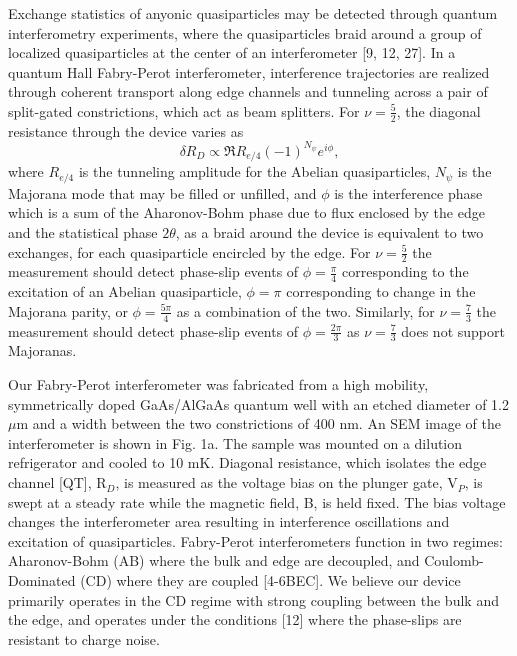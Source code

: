 \documentclass[]{article}
\begin{document}
	Exchange statistics of anyonic quasiparticles may be detected through quantum interferometry experiments, where the quasiparticles braid around a group of localized quasiparticles at the center of an interferometer [9, 12, 27]. In a quantum Hall Fabry-Perot interferometer, interference trajectories are realized through coherent transport along edge channels and tunneling across a pair of split-gated constrictions, which act as beam splitters. For $\nu = \frac{5}{2}$, the diagonal resistance through the device varies as 
	\begin{equation}
	\delta R_D \propto \Re{R_{e/4}(-1)^{N_\psi}e^{i\phi}},
	\end{equation}
	where $R_{e/4}$ is the tunneling amplitude for the Abelian quasiparticles, $N_\psi$ is the Majorana mode that may be filled or unfilled, and $\phi$ is the interference phase which is a sum of the Aharonov-Bohm phase due to flux enclosed by the edge and the statistical phase $2\theta$, as a braid around the device is equivalent to two exchanges, for each quasiparticle encircled by the edge. For $\nu=\frac{5}{2}$ the measurement should detect phase-slip events of $\phi = \frac{\pi}{4}$ corresponding to the excitation of an Abelian quasiparticle, $\phi = \pi$ corresponding to change in the Majorana parity, or $\phi = \frac{5\pi}{4}$ as a combination of the two. Similarly, for $\nu = \frac{7}{3}$ the measurement should detect phase-slip events of $\phi = \frac{2\pi}{3}$ as $\nu = \frac{7}{3}$ does not support Majoranas.
	
Our Fabry-Perot interferometer was fabricated from a high mobility, symmetrically doped GaAs/AlGaAs quantum well with an etched diameter of 1.2 $\mu$m and a width between the two constrictions of 400 nm. An SEM image of the interferometer is shown in Fig. 1a. The sample was mounted on a dilution refrigerator and cooled to 10 mK. Diagonal resistance, which isolates the edge channel [QT],   R$_D$, is measured as the voltage bias on the plunger gate, V$_P$, is swept at a steady rate while the magnetic field, B, is held fixed. The bias voltage changes the interferometer area resulting in interference oscillations and excitation of quasiparticles. Fabry-Perot interferometers function in two regimes: Aharonov-Bohm (AB) where the bulk and edge are decoupled, and Coulomb-Dominated (CD) where they are coupled [4-6BEC]. We believe our device primarily operates in the CD regime with strong coupling between the bulk and the edge, and operates under the conditions [12] where the phase-slips are resistant to charge noise.
\end{document}
